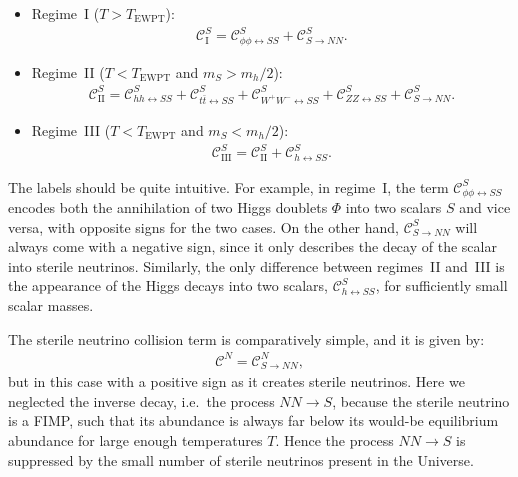 \begin{itemize}
\item Regime~I ($T>T_\text{EWPT}$):
\begin{align}\label{eq:ct_scalar_above_pt}
\mathcal{C}^S_\text{I} = \mathcal{C}^S_{\phi\phi \leftrightarrow SS} + \mathcal{C}^S_{S \rightarrow NN}.
\end{align}
\item Regime~II ($T<T_\text{EWPT}$  and  $m_S> m_h/2$):
\begin{align}\label{eq:ct_scalar_below_pt_large_m}
\mathcal{C}^S_\text{II} = \mathcal{C}^S_{hh \leftrightarrow SS} + \mathcal{C}^S_{t\bar{t} \leftrightarrow SS} + \mathcal{C}^S_{W^+W^- \leftrightarrow SS} + \mathcal{C}^S_{ZZ \leftrightarrow SS} + \mathcal{C}^S_{S \rightarrow NN}.
\end{align}
\item Regime~III ($T<T_\text{EWPT}$ and  $m_S < m_h/2$):
\begin{align}\label{eq:ct_scalar_below_pt_small_m}
\mathcal{C}^S_\text{III} =\mathcal{C}^S_\text{II} + \mathcal{C}^S_{h \leftrightarrow SS}.
\end{align}
\end{itemize}
The labels should be quite intuitive. For example, in regime~I, the term $\mathcal{C}^S_{\phi\phi \leftrightarrow SS}$ encodes both the annihilation of two Higgs doublets $\Phi$ into two scalars $S$ and vice versa, with opposite signs for the two cases. On the other hand, $\mathcal{C}^S_{S \rightarrow NN}$ will always come with a negative sign, since it only describes the decay of the scalar into sterile neutrinos. Similarly, the only difference between regimes~II and~III is the appearance of the Higgs decays into two scalars, $\mathcal{C}^S_{h \leftrightarrow SS}$, for sufficiently small scalar masses. 

The sterile neutrino collision term is comparatively simple, and it is given by:
\begin{align}
 \mathcal{C}^N = \mathcal{C}^N_{S \rightarrow NN},
 \label{eq:ct_sterile_neurtrino}
\end{align}
but in this case with a positive sign as it creates sterile neutrinos. Here we neglected the inverse decay, i.e.\ the process $NN \rightarrow S$, because the sterile neutrino is a FIMP, such that its abundance is always far below its would-be equilibrium abundance for large enough temperatures $T$. Hence the process $NN \rightarrow S$ is suppressed by the small number of sterile neutrinos present in the Universe.

